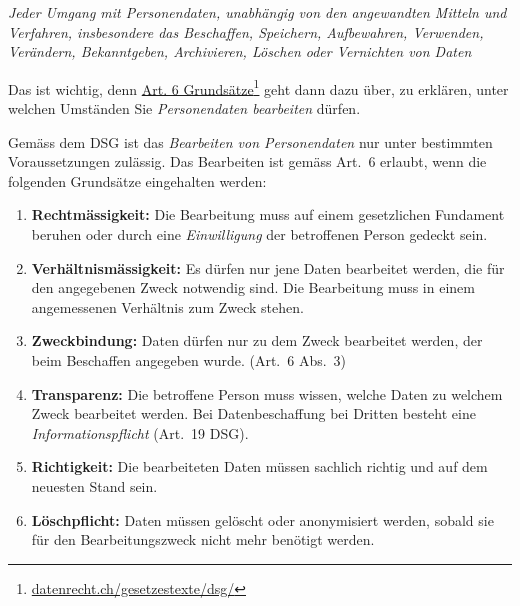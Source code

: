 \begin{lpu}
\begin{theorie}
    \textit{Jeder Umgang mit Personendaten, unabhängig von den angewandten Mitteln und Verfahren, insbesondere das Beschaffen, Speichern, Aufbewahren, Verwenden, Verändern, Bekanntgeben, Archivieren, Löschen oder Vernichten von Daten}
\end{theorie}

Das ist wichtig, denn \href{https://datenrecht.ch/gesetzestexte/dsg/#id686591b1ad7a0}{Art. 6 Grundsätze}\footnote{\href{https://datenrecht.ch/gesetzestexte/dsg/#id686591b1ad7a0}{\url{datenrecht.ch/gesetzestexte/dsg/}}} geht dann dazu über, zu erklären, unter welchen Umständen Sie \textit{Personendaten bearbeiten} dürfen.

\begin{theorie}
Gemäss dem DSG ist das \emph{Bearbeiten von Personendaten} nur unter bestimmten Voraussetzungen zulässig. Das Bearbeiten ist gemäss Art.\ 6 erlaubt, wenn die folgenden Grundsätze eingehalten werden:

\begin{enumerate}
  \item \textbf{Rechtmässigkeit:} Die Bearbeitung muss auf einem gesetzlichen Fundament beruhen oder durch eine \emph{Einwilligung} der betroffenen Person gedeckt sein.
  
  \item \textbf{Verhältnismässigkeit:} Es dürfen nur jene Daten bearbeitet werden, die für den angegebenen Zweck notwendig sind. Die Bearbeitung muss in einem angemessenen Verhältnis zum Zweck stehen.

  \item \textbf{Zweckbindung:} Daten dürfen nur zu dem Zweck bearbeitet werden, der beim Beschaffen angegeben wurde. (Art.\ 6 Abs.\ 3)
  
  \item \textbf{Transparenz:} Die betroffene Person muss wissen, welche Daten zu welchem Zweck bearbeitet werden. Bei Datenbeschaffung bei Dritten besteht eine \emph{Informationspflicht} (Art.\ 19 DSG).

  \item \textbf{Richtigkeit:} Die bearbeiteten Daten müssen sachlich richtig und auf dem neuesten Stand sein.

  \item \textbf{Löschpflicht:} Daten müssen gelöscht oder anonymisiert werden, sobald sie für den Bearbeitungszweck nicht mehr benötigt werden.
\end{enumerate}
\end{theorie}


\end{lpu}
